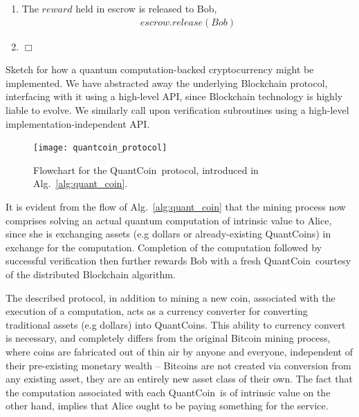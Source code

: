 \begin{table}[!htbp]
\begin{mdframed}[innertopmargin=3pt, innerbottommargin=3pt, nobreak]
{\begin{enumerate}
\begin{align}
		&Bob.receive(token)
	\end{align}
	\item The $reward$ held in escrow is released to Bob,
	\begin{align}
		escrow.release(Bob)
	\end{align}
	\item $\Box$
\end{enumerate}}
\end{mdframed}
\captionspacealg \caption{Sketch for how a quantum computation-backed cryptocurrency might be implemented. We have abstracted away the underlying Blockchain protocol, interfacing with it using a high-level API, since Blockchain technology is highly liable to evolve. We similarly call upon verification subroutines using a high-level implementation-independent API.} \label{alg:quant_coin}
\end{table}

\begin{figure}[!htbp]
\texttt{[image: quantcoin\_protocol]}
\captionspacefig \caption{Flowchart for the QuantCoin\texttrademark\, protocol, introduced in Alg.~\ref{alg:quant_coin}.}\label{fig:quantcoin_protocol}	
\end{figure}

It is evident from the flow of Alg.~\ref{alg:quant_coin} that the mining process now comprises solving an actual quantum computation of intrinsic value to Alice, since she is exchanging assets (e.g dollars or already-existing QuantCoins\texttrademark) in exchange for the computation. Completion of the computation followed by successful verification then further rewards Bob with a fresh QuantCoin\texttrademark\, courtesy of the distributed Blockchain algorithm.

The described protocol, in addition to mining a new coin, associated with the execution of a computation, acts as a currency converter for converting traditional assets (e.g dollars) into QuantCoins\texttrademark. This ability to currency convert is necessary, and completely differs from the original Bitcoin mining process, where coins are fabricated out of thin air by anyone and everyone, independent of their pre-existing monetary wealth -- Bitcoins are not created via conversion from any existing asset, they are an entirely new asset class of their own. The fact that the computation associated with each QuantCoin\texttrademark\, is of intrinsic value on the other hand, implies that Alice ought to be paying something for the service.

